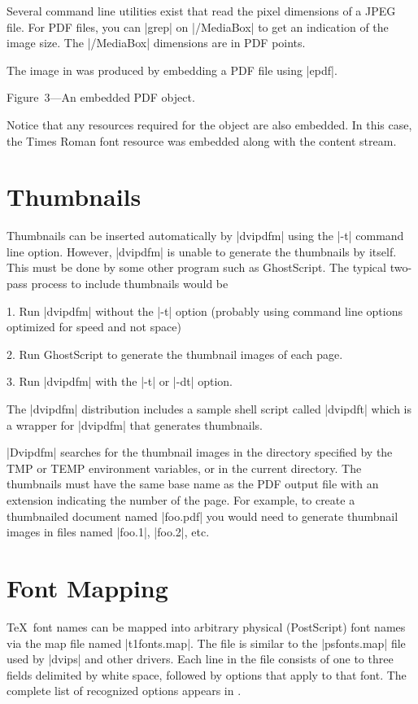{Several command line utilities exist that read
the pixel dimensions of a JPEG file.  For PDF files,
you can |grep| on |/MediaBox| to get an indication
of the image size.  The |/MediaBox| dimensions are
in PDF points.

The image in  was produced by embedding a PDF file
using |epdf|.

\topinsert
{}
\centerline{}
\medskip\centerline{\subheadingfont
\begincolor{\blue}Figure~3---An embedded PDF object.
\endcolor}
\endinsert
Notice that any resources required for the object
are also embedded.  In this case, the Times Roman font
resource was embedded along with the content stream.

\section{Thumbnails}
Thumbnails can be inserted automatically by |dvipdfm|
using the |-t| command line option.  However, |dvipdfm|
is unable to generate the thumbnails by itself.  This
must be done by some other program such as GhostScript.
The typical two-pass process to include thumbnails would be
\item{1.}
Run |dvipdfm| without the |-t| option (probably
using command line options optimized for speed and not space)
\item{2.}
Run GhostScript to generate the thumbnail images of
each page.
\item{3.}
Run |dvipdfm| with the |-t| or |-dt| option.

The |dvipdfm| distribution includes a sample
shell script called |dvipdft| which is a wrapper
for |dvipdfm| that generates thumbnails.

|Dvipdfm| searches for the thumbnail images
in the directory specified by the TMP or TEMP
environment variables, or in the current directory.
The thumbnails must have the same base name as the PDF output
file with an extension indicating the number of the page.
For example, to create a thumbnailed document named |foo.pdf|
you would need to generate thumbnail images in files named
|foo.1|, |foo.2|, etc.

\section{Font Mapping}
\TeX\ font names can be
mapped into arbitrary physical (PostScript) font names via
the map file named |t1fonts.map|.  The file is
similar to the |psfonts.map| file used by |dvips|
and other drivers.  Each line in the
file consists of one to three fields delimited
by white space, followed by options that apply to that font.
The complete list of recognized options
appears in .

}
